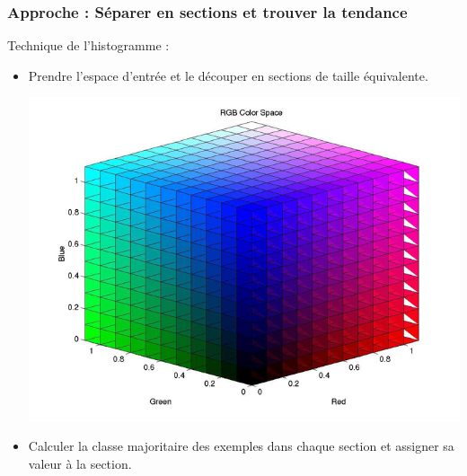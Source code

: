 \documentclass[french]{beamer}
\begin{document}
\begin{frame}[fragile]
\frametitle{Approche : Séparer en sections et trouver la tendance}

Technique de l'histogramme :
\begin{itemize}
\item Prendre l'espace d'entrée et le découper en sections de taille équivalente. 

\begin{center}
\includegraphics[scale=0.25]{RGB-color-space.jpg}
\end{center}
		
\item Calculer la classe majoritaire des exemples dans chaque section et assigner sa valeur à la section.


\end{itemize}

\end{frame}
\end{document}
